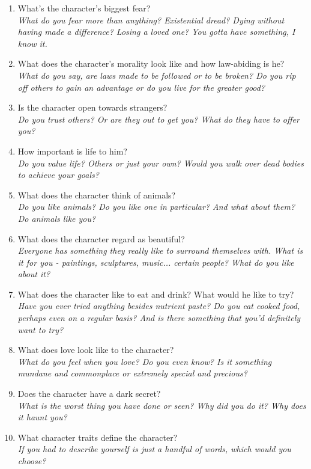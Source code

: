 \documentclass[12pt,a4paper,openany,usenames,dvipsnames]{book}
\begin{document}
\begin{enumerate}
		\item What’s the character’s biggest fear?\\
			\textit{What do you fear more than anything? Existential dread? Dying without having made a difference? Losing a loved one? You gotta have something, I know it.}
		\item What does the character’s morality look like and how law-abiding is he?\\
			\textit{What do you say, are laws made to be followed or to be broken? Do you rip off others to gain an advantage or do you live for the greater good?}
		\item Is the character open towards strangers?\\
			\textit{Do you trust others? Or are they out to get you? What do they have to offer you?}
		\item How important is life to him?\\
			\textit{Do you value life? Others or just your own? Would you walk over dead bodies to achieve your goals?}
		\item What does the character think of animals?\\
			\textit{Do you like animals? Do you like one in particular? And what about them? Do animals like you?}
		\item What does the character regard as beautiful?\\
			\textit{Everyone has something they really like to surround themselves with. What is it for you - paintings, sculptures, music... certain people? What do you like about it?}
		\item What does the character like to eat and drink? What would he like to try?\\
			\textit{Have you ever tried anything besides nutrient paste? Do you eat cooked food, perhaps even on a regular basis? And is there something that you'd definitely want to try?}
		\item What does love look like to the character?\\
			\textit{What do you feel when you love? Do you even know? Is it something mundane and commonplace or extremely special and precious?}
		\item Does the character have a dark secret?\\
			\textit{What is the worst thing you have done or seen? Why did you do it? Why does it haunt you?}
		\item What character traits define the character?\\
			\textit{If you had to describe yourself is just a handful of words, which would you choose?}
	\end{enumerate}
	
\end{document}
